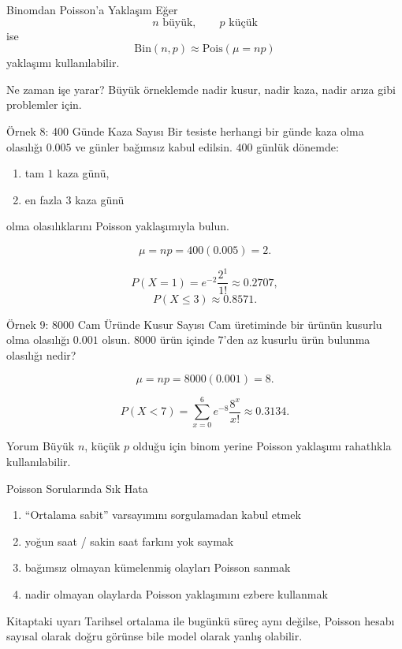 \documentclass[light]{lutbeamer}
\begin{document}
\begin{frame}{Binomdan Poisson'a Yaklaşım}
    \small
    Eğer
    \[
    n \text{ büyük}, \qquad p \text{ küçük}
    \]
    ise
    \[
    \mathrm{Bin}(n,p)\approx \mathrm{Pois}(\mu=np)
    \]
    yaklaşımı kullanılabilir.

    \begin{block}{Ne zaman işe yarar?}
        Büyük örneklemde nadir kusur, nadir kaza, nadir arıza gibi problemler için.
    \end{block}
\end{frame}

\begin{frame}{Örnek 8: 400 Günde Kaza Sayısı}
    \small
    Bir tesiste herhangi bir günde kaza olma olasılığı \(0.005\) ve günler bağımsız kabul edilsin. \(400\) günlük dönemde:
    \begin{enumerate}
        \item[(a)] tam \(1\) kaza günü,
        \item[(b)] en fazla \(3\) kaza günü
    \end{enumerate}
    olma olasılıklarını Poisson yaklaşımıyla bulun.

    \[
    \mu=np=400(0.005)=2.
    \]

    \[
    P(X=1)=e^{-2}\frac{2^1}{1!}\approx 0.2707,
    \]
    \[
    P(X\le 3)\approx 0.8571.
    \]
\end{frame}

\begin{frame}{Örnek 9: 8000 Cam Üründe Kusur Sayısı}
    \small
    Cam üretiminde bir ürünün kusurlu olma olasılığı \(0.001\) olsun. \(8000\) ürün içinde \(7\)'den az kusurlu ürün bulunma olasılığı nedir?

    \[
    \mu=np=8000(0.001)=8.
    \]

    \[
    P(X<7)=\sum_{x=0}^{6} e^{-8}\frac{8^x}{x!}\approx 0.3134.
    \]

    \begin{exampleblock}{Yorum}
        Büyük \(n\), küçük \(p\) olduğu için binom yerine Poisson yaklaşımı rahatlıkla kullanılabilir.
    \end{exampleblock}
\end{frame}

\begin{frame}{Poisson Sorularında Sık Hata}
    \small
    \begin{enumerate}
        \item ``Ortalama sabit'' varsayımını sorgulamadan kabul etmek
        \item yoğun saat / sakin saat farkını yok saymak
        \item bağımsız olmayan kümelenmiş olayları Poisson sanmak
        \item nadir olmayan olaylarda Poisson yaklaşımını ezbere kullanmak
    \end{enumerate}

    \begin{alertblock}{Kitaptaki uyarı}
        Tarihsel ortalama ile bugünkü süreç aynı değilse, Poisson hesabı sayısal olarak doğru görünse bile model olarak yanlış olabilir.
    \end{alertblock}
\end{frame}
\end{document}
